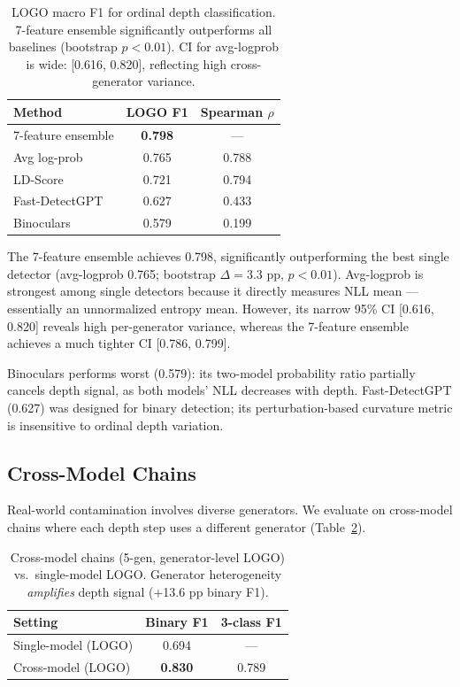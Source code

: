 \documentclass[11pt,twocolumn]{article}
\begin{document}
\begin{table}[t]
\centering
\small
\begin{tabular}{lcc}
\toprule
\textbf{Method} & \textbf{LOGO F1} & \textbf{Spearman $\rho$} \\
\midrule
7-feature ensemble & \textbf{0.798} & --- \\
Avg log-prob & 0.765 & 0.788 \\
LD-Score & 0.721 & 0.794 \\
Fast-DetectGPT & 0.627 & 0.433 \\
Binoculars & 0.579 & 0.199 \\
\bottomrule
\end{tabular}
\caption{LOGO macro F1 for ordinal depth classification. 7-feature ensemble significantly outperforms all baselines (bootstrap $p < 0.01$). CI for avg-logprob is wide: [0.616, 0.820], reflecting high cross-generator variance.}
\label{tab:baseline}
\end{table}

The 7-feature ensemble achieves 0.798, significantly outperforming the best single detector (avg-logprob 0.765; bootstrap $\Delta = 3.3$ pp, $p < 0.01$).
Avg-logprob is strongest among single detectors because it directly measures NLL mean --- essentially an unnormalized entropy mean.
However, its narrow 95\% CI [0.616, 0.820] reveals high per-generator variance, whereas the 7-feature ensemble achieves a much tighter CI [0.786, 0.799].

Binoculars performs worst (0.579): its two-model probability ratio partially cancels depth signal, as both models' NLL decreases with depth.
Fast-DetectGPT (0.627) was designed for binary detection; its perturbation-based curvature metric is insensitive to ordinal depth variation.

\subsection{Cross-Model Chains}
\label{sec:crossmodel}

Real-world contamination involves diverse generators. We evaluate on cross-model chains where each depth step uses a different generator (Table~\ref{tab:crossmodel}).

\begin{table}[t]
\centering
\small
\begin{tabular}{lcc}
\toprule
\textbf{Setting} & \textbf{Binary F1} & \textbf{3-class F1} \\
\midrule
Single-model (LOGO) & 0.694 & --- \\
Cross-model (LOGO) & \textbf{0.830} & 0.789 \\
\bottomrule
\end{tabular}
\caption{Cross-model chains (5-gen, generator-level LOGO) vs.\ single-model LOGO. Generator heterogeneity \emph{amplifies} depth signal ($+$13.6 pp binary F1).}
\label{tab:crossmodel}
\end{table}
\end{document}
